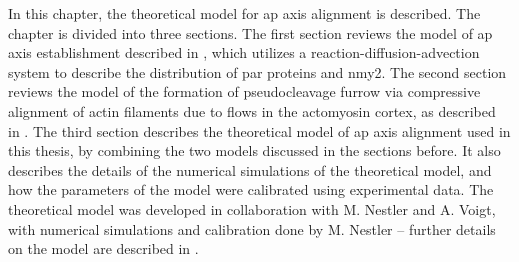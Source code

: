In this chapter, the theoretical model for \ac{ap} axis alignment is described. The chapter is divided into three sections. The first section reviews the model of \ac{ap} axis establishment described in \cite{gross2019guiding}, which utilizes a reaction-diffusion-advection system to describe the distribution of \ac{par} proteins and \ac{nmy2}. The second section reviews the model of the formation of pseudocleavage furrow via compressive alignment of actin filaments due to flows in the actomyosin cortex, as described in \cite{reymann2016cortical}. The third section describes the theoretical model of \ac{ap} axis alignment used in this thesis, by combining the two models discussed in the sections before. It also describes the details of the numerical simulations of the theoretical model, and how the parameters of the model were calibrated using experimental data. The theoretical model was developed in collaboration with M. Nestler and A. Voigt, with numerical simulations and calibration done by M. Nestler -- further details on the model are described in \cite{}.

